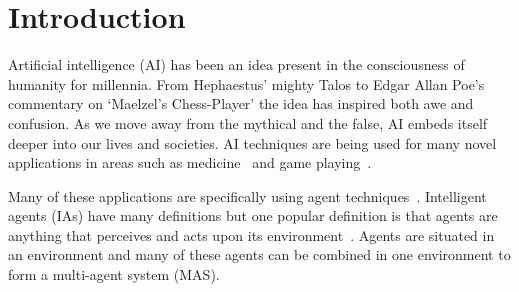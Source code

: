 \documentclass[]{final_report}
\begin{document}
\chapter{Introduction}
Artificial intelligence (AI) has been an idea present in the consciousness of humanity for millennia. From Hephaestus' mighty Talos to Edgar Allan Poe's commentary on `Maelzel's Chess-Player' the idea has inspired both awe and confusion. As we move away from the mythical and the false, AI embeds itself deeper into our lives and societies. AI techniques are being used for many novel applications in areas such as medicine~\cite{glaucoma} and game playing~\cite{alphago}.\par
Many of these applications are specifically using agent techniques~\cite{silverman2015systems, mvfcec, brockman2016openai}. Intelligent agents (IAs) have many definitions but one popular definition is that agents are anything that perceives and acts upon its environment~\cite{russell2016artificial}. Agents are situated in an environment and many of these agents can be combined in one environment to form a multi-agent system (MAS).
\end{document}
